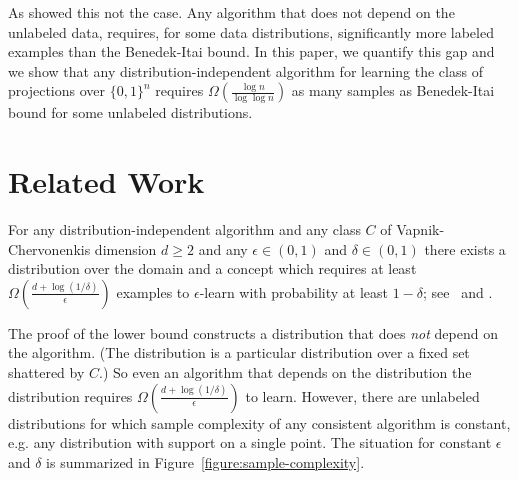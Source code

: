 \documentclass[10pt]{article}
\begin{document}
As \cite{Darnstadt-Simon-Szorenyi-2013} showed this not the case. Any algorithm
that does not depend on the unlabeled data, requires, for some data
distributions, significantly more labeled examples than the Benedek-Itai bound.
In this paper, we quantify this gap and we show that any
distribution-independent algorithm for learning the class of projections over
$\{0,1\}^n$ requires $\Omega(\frac{\log n}{\log \log n})$ as many samples as
Benedek-Itai bound for some unlabeled distributions.

\section{Related Work}

For any distribution-independent algorithm and any class $C$ of
Vapnik-Chervonenkis dimension $d \ge 2$ and any $\epsilon \in (0,1)$ and $\delta
\in (0,1)$ there exists a distribution over the domain and a concept which
requires at least $\Omega \left(\frac{d + \log(1/\delta)}{\epsilon}\right)$
examples to $\epsilon$-learn with probability at least $1 - \delta$;
see~\cite[Theorem 5.3]{Anthony-Bartlett-1999} and
\cite{Blumer-Ehrenfeucht-Haussler-Warmuth-1989,
Ehrenfeucht-Haussler-Kearns-Valiant-1989}.

The proof of the lower bound constructs a distribution that does \emph{not}
depend on the algorithm. (The distribution is a particular distribution over a
fixed set shattered by $C$.) So even an algorithm that depends on the
distribution the distribution requires $\Omega \left(\frac{d +
\log(1/\delta)}{\epsilon}\right)$ to learn. However, there are unlabeled
distributions for which sample complexity of any consistent algorithm is
constant, e.g. any distribution with support on a single point. The situation
for constant $\epsilon$ and $\delta$ is summarized in
Figure~\ref{figure:sample-complexity}.
\end{document}

